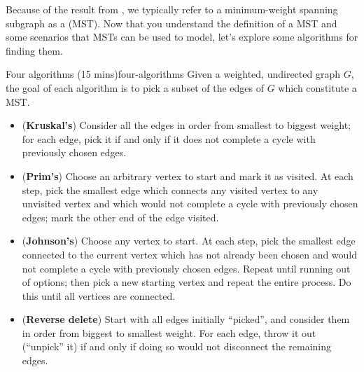 \documentclass{tufte-handout}
\begin{document}
Because of the result from , we typically refer to
a minimum-weight spanning subgraph as a 
(MST).  Now that you understand the definition of a MST and some
scenarios that MSTs can be used to model, let's explore some
algorithms for finding them.

\begin{model*}{Four algorithms (15 mins)}{four-algorithms}
  Given a weighted, undirected graph $G$, the goal of each algorithm
  is to pick a subset of the edges of $G$ which constitute a MST.
  \begin{itemize}
  \item (\textbf{Kruskal's}) Consider all the edges in order from
    smallest to biggest weight; for each edge, pick it if and only if
    it does not complete a cycle with previously chosen edges.
  \item (\textbf{Prim's}) Choose an arbitrary vertex to start and mark
    it as visited.  At each step, pick the smallest edge which
    connects any visited vertex to any unvisited vertex and which would
    not complete a cycle with previously chosen edges; mark the other
    end of the edge visited.
  \item (\textbf{Johnson's}) Choose any vertex to start.  At each step,
    pick the smallest edge connected to the current vertex which has
    not already been chosen and would not complete a cycle with
    previously chosen edges.  Repeat until running out of options;
    then pick a new starting vertex and repeat the entire process.  Do
    this until all vertices are connected.
  \item (\textbf{Reverse delete}) Start with all edges initially
    ``picked'', and consider them in order from biggest to smallest
    weight.  For each edge, throw it out (\ie ``unpick'' it) if and
    only if doing so would not disconnect the remaining edges.
  \end{itemize}
\end{model*}
\end{document}
